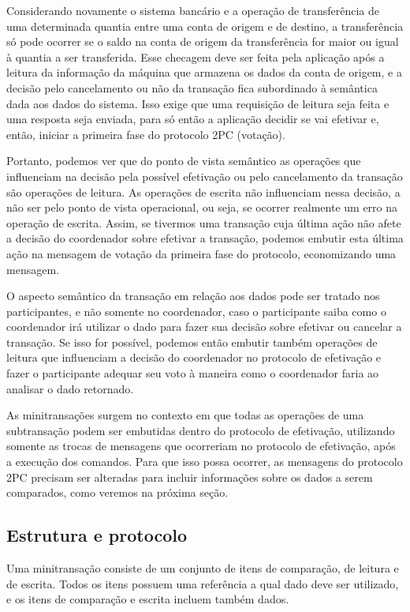 \documentclass[11pt,twoside,a4paper]{book}
\begin{document}
Considerando novamente o sistema bancário e a operação de transferência de uma determinada quantia entre uma conta de origem e de destino, a transferência só pode ocorrer se o saldo na conta de origem da transferência for maior ou igual à quantia a ser transferida. Esse checagem deve ser feita pela aplicação após a leitura da informação da máquina que armazena os dados da conta de origem, e a decisão pelo cancelamento ou não da transação fica subordinado à semântica dada aos dados do sistema. Isso exige que uma requisição de leitura seja feita e uma resposta seja enviada, para só então a aplicação decidir se vai efetivar e, então, iniciar a primeira fase do protocolo 2PC (votação).

Portanto, podemos ver que do ponto de vista semântico as operações que influenciam na decisão pela possível efetivação ou pelo cancelamento da transação são operações de leitura. As operações de escrita não influenciam nessa decisão, a não ser pelo ponto de vista operacional, ou seja, se ocorrer realmente um erro na operação de escrita. Assim, se tivermos uma transação cuja última ação não afete a decisão do coordenador sobre efetivar a transação, podemos embutir esta última ação na mensagem de votação da primeira fase do protocolo, economizando uma mensagem.

O aspecto semântico da transação em relação aos dados pode ser tratado nos participantes, e não somente no coordenador, caso o participante saiba como o coordenador irá utilizar o dado para fazer sua decisão sobre efetivar ou cancelar a transação. Se isso for possível, podemos então embutir também operações de leitura que influenciam a decisão do coordenador no protocolo de efetivação e fazer o participante adequar seu voto à maneira como o coordenador faria ao analisar o dado retornado.

As minitransações surgem no contexto em que todas as operações de uma subtransação podem ser embutidas dentro do protocolo de efetivação, utilizando somente as trocas de mensagens que ocorreriam no protocolo de efetivação, após a execução dos comandos. Para que isso possa ocorrer, as mensagens do protocolo 2PC precisam ser alteradas para incluir informações sobre os dados a serem comparados, como veremos na próxima seção.

\subsection{Estrutura e protocolo}
\label{subsec:estrutura-minitransacoes}
Uma minitransação consiste de um conjunto de itens de comparação, de leitura e de escrita. Todos os itens possuem uma referência a qual dado deve ser utilizado, e os itens de comparação e escrita incluem também dados. 
\end{document}
